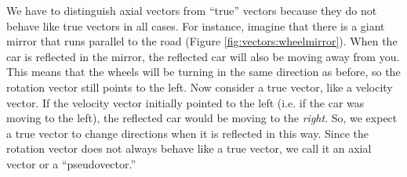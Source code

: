 We have to distinguish axial vectors from ``true'' vectors because they do not behave like true vectors in all cases. 
For instance, imagine that there is a giant mirror that runs parallel to the road (Figure \ref{fig:vectors:wheelmirror}). When the car is reflected in the mirror, the reflected car will also be moving away from you. This means that the wheels will be turning in the same direction as before, so the rotation vector still points to the left. Now consider a true vector, like a velocity vector. If the velocity vector initially pointed to the left (i.e. if the car was moving to the left), the reflected car would be moving to the \textit{right}. So, we expect a true vector to change directions when it is reflected in this way. Since the rotation vector does not always behave like a true vector, we call it an axial vector or a ``pseudovector.''



